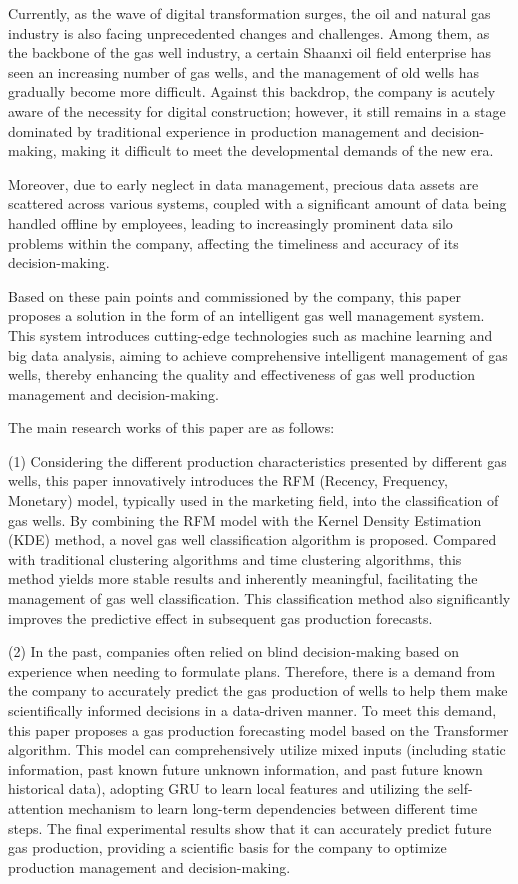 \begin{englishabstract}
    Currently, as the wave of digital transformation surges, the oil and natural gas industry is also facing unprecedented changes and challenges. Among them, as the backbone of the gas well industry, a certain Shaanxi oil field enterprise has seen an increasing number of gas wells, and the management of old wells has gradually become more difficult. Against this backdrop, the company is acutely aware of the necessity for digital construction; however, it still remains in a stage dominated by traditional experience in production management and decision-making, making it difficult to meet the developmental demands of the new era.

Moreover, due to early neglect in data management, precious data assets are scattered across various systems, coupled with a significant amount of data being handled offline by employees, leading to increasingly prominent data silo problems within the company, affecting the timeliness and accuracy of its decision-making.

Based on these pain points and commissioned by the company, this paper proposes a solution in the form of an intelligent gas well management system. This system introduces cutting-edge technologies such as machine learning and big data analysis, aiming to achieve comprehensive intelligent management of gas wells, thereby enhancing the quality and effectiveness of gas well production management and decision-making.

The main research works of this paper are as follows:

(1) Considering the different production characteristics presented by different gas wells, this paper innovatively introduces the RFM (Recency, Frequency, Monetary) model, typically used in the marketing field, into the classification of gas wells. By combining the RFM model with the Kernel Density Estimation (KDE) method, a novel gas well classification algorithm is proposed. Compared with traditional clustering algorithms and time clustering algorithms, this method yields more stable results and inherently meaningful, facilitating the management of gas well classification. This classification method also significantly improves the predictive effect in subsequent gas production forecasts.

(2) In the past, companies often relied on blind decision-making based on experience when needing to formulate plans. Therefore, there is a demand from the company to accurately predict the gas production of wells to help them make scientifically informed decisions in a data-driven manner. To meet this demand, this paper proposes a gas production forecasting model based on the Transformer algorithm. This model can comprehensively utilize mixed inputs (including static information, past known future unknown information, and past future known historical data), adopting GRU to learn local features and utilizing the self-attention mechanism to learn long-term dependencies between different time steps. The final experimental results show that it can accurately predict future gas production, providing a scientific basis for the company to optimize production management and decision-making.


\end{englishabstract}
